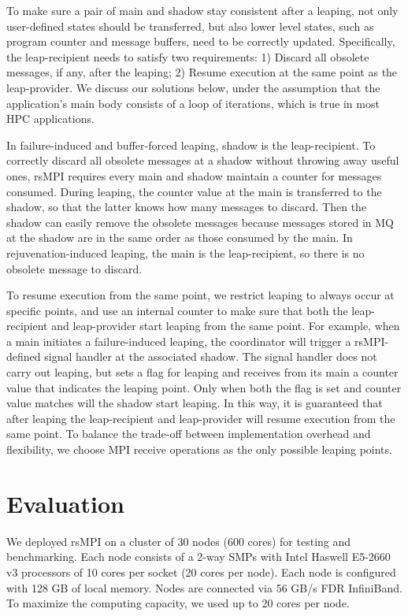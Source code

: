To make sure a pair of main and shadow stay consistent after a leaping, not only user-defined states should be transferred, but also lower level states, such as program counter and message buffers, need to be correctly updated. Specifically, the leap-recipient needs to satisfy two requirements:  
1) Discard all obsolete messages, if any, after the leaping; 2) Resume execution at the same point as the leap-provider. We discuss our solutions below, under the assumption that the application's main body consists of a loop of iterations, which is true in most HPC applications.

In failure-induced and buffer-forced leaping, shadow is the leap-recipient. 
To correctly discard all obsolete messages at a shadow without throwing away useful ones, rsMPI requires every main and shadow maintain a counter for messages consumed. During leaping, the counter value at the main is transferred to the shadow, so that the latter knows how many messages to discard. Then the shadow can easily remove the obsolete messages because messages stored in MQ at the shadow are in the same order as those consumed by the main. In rejuvenation-induced leaping, the main is the leap-recipient, so there is no obsolete message to discard. 


To resume execution from the same point, we restrict leaping to always occur at specific points, and use an internal counter to make sure that both the leap-recipient and leap-provider start leaping from the same point. For example, when a main initiates a failure-induced leaping, the coordinator will trigger a rsMPI-defined signal handler at the associated shadow. The signal handler does not carry out leaping, but sets a flag for leaping and receives from its main a counter value that indicates the leaping point. %
Only when both the flag is set and counter value matches will the shadow start leaping. In this way, it is guaranteed that after leaping the leap-recipient and leap-provider will resume execution from the same point. To balance the trade-off between implementation overhead and flexibility, we choose MPI receive operations as the only possible leaping points. 

\section{Evaluation}
We deployed rsMPI on a cluster of 30 nodes (600 cores) for testing and benchmarking. Each node consists of a 2-way SMPs with Intel Haswell E5-2660 v3 processors of 10 cores per socket (20 cores per node). Each node is configured with 128 GB of local memory. Nodes are connected via 56 GB/s FDR InfiniBand. To maximize the computing capacity, we used up to 20 cores per node.

